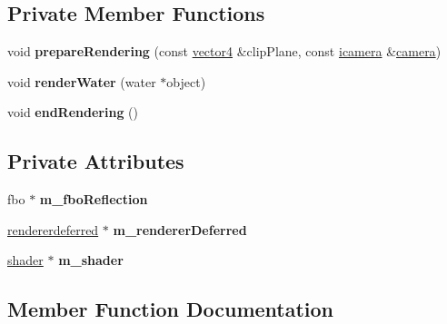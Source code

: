 \subsection*{Private Member Functions}
\begin{DoxyCompactItemize}
\item 
\mbox{\label{classflounder_1_1rendererwaters_a8d022821e036a2d096c544db6d324191}} 
void {\bfseries prepare\+Rendering} (const \hyperlink{classflounder_1_1vector4}{vector4} \&clip\+Plane, const \hyperlink{classflounder_1_1icamera}{icamera} \&\hyperlink{classflounder_1_1camera}{camera})
\item 
\mbox{\label{classflounder_1_1rendererwaters_ab644da250a6babfeaa4bd58345757c1f}} 
void {\bfseries render\+Water} (water $\ast$object)
\item 
\mbox{\label{classflounder_1_1rendererwaters_ae274a0b74c3b23f55b00ab70d68355e2}} 
void {\bfseries end\+Rendering} ()
\end{DoxyCompactItemize}
\subsection*{Private Attributes}
\begin{DoxyCompactItemize}
\item 
\mbox{\label{classflounder_1_1rendererwaters_a2aa47de7c771b3ee458c0be9f8e4e89a}} 
fbo $\ast$ {\bfseries m\+\_\+fbo\+Reflection}
\item 
\mbox{\label{classflounder_1_1rendererwaters_a035c77caa561b65ad22caea2aeda7824}} 
\hyperlink{classflounder_1_1rendererdeferred}{rendererdeferred} $\ast$ {\bfseries m\+\_\+renderer\+Deferred}
\item 
\mbox{\label{classflounder_1_1rendererwaters_a19194178db14e1298325c43272ff7617}} 
\hyperlink{classflounder_1_1shader}{shader} $\ast$ {\bfseries m\+\_\+shader}
\end{DoxyCompactItemize}


\subsection{Member Function Documentation}
\mbox{\label{classflounder_1_1rendererwaters_a2adb0c22d5aa6c76fb6eee3f69239398}} 
